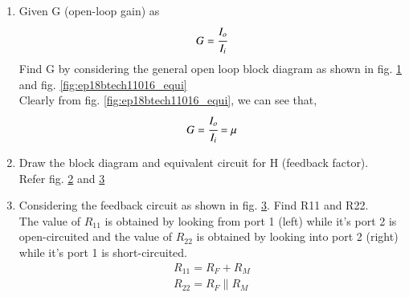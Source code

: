 \begin{enumerate}[label=\arabic*.,ref=\theenumi]
\item Given G (open-loop gain) as
\begin{align}
     G = \cfrac{I_o}{I_i}
\end{align}
Find G by considering the general open loop block diagram as shown in fig. \ref{fig:ep18btech11016_open} and fig. \ref{fig:ep18btech11016_equi}
\\
\solution Clearly from fig. \ref{fig:ep18btech11016_equi}, we can see that,
\begin{align}
    G = \cfrac{I_o}{I_i} = \mu
    \label{eq:ep18btech11016_ol_gain}
\end{align}

\begin{figure}[!ht]
	\begin{center}
		\resizebox{\columnwidth}{!}{}
	\end{center}
\caption{}
\label{fig:ep18btech11016_open}
\end{figure}


\item Draw the block diagram and equivalent circuit for H (feedback factor).
\\
\solution Refer fig. \ref{fig:ep18btech11016_feed} and \ref{fig:ep18btech11016_feed_circuit}

\renewcommand{\thefigure}{\theenumi.\arabic{figure}}
\begin{figure}[!ht]
	\begin{center}
		\resizebox{\columnwidth}{!}{}
	\end{center}
\caption{}
\label{fig:ep18btech11016_feed}
\end{figure}

\begin{figure}[!ht]
	\begin{center}
		\resizebox{\columnwidth}{!}{}
	\end{center}
\caption{}
\label{fig:ep18btech11016_feed_circuit}
\end{figure}
\renewcommand{\thefigure}{\theenumi}


\item Considering the feedback circuit as shown in fig. \ref{fig:ep18btech11016_feed_circuit}. Find R11 and R22.
\\
\solution The value of $R_{11}$ is obtained by  looking from port 1 (left) while it's port 2 is open-circuited and the value of $R_{22}$ is obtained by looking into port 2 (right) while it's port 1 is short-circuited.
\begin{align}
    R_{11} = R_F + R_M\\
    R_{22} = R_F \parallel R_M
\end{align}


\end{enumerate}
